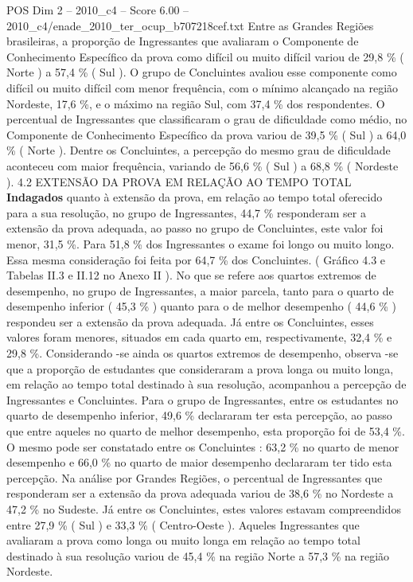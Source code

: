\begin{textsample}{POS Dim 2 – 2010\_c4 – Score 6.00 – 2010\_c4/enade\_2010\_ter\_ocup\_b707218cef.txt}
Entre as Grandes Regiões brasileiras, a proporção de Ingressantes que avaliaram o Componente de Conhecimento Específico da prova como difícil ou muito difícil variou de 29,8 \% ( Norte ) a 57,4 \% ( Sul ).
O grupo de Concluintes avaliou esse componente como difícil ou muito difícil com menor frequência, com o mínimo alcançado na região Nordeste, 17,6 \%, e o máximo na região Sul, com 37,4 \% dos respondentes.
O percentual de Ingressantes que classificaram o grau de dificuldade como médio, no Componente de Conhecimento Específico da prova variou de 39,5 \% ( Sul ) a 64,0 \% ( Norte ).
Dentre os Concluintes, a percepção do mesmo grau de dificuldade aconteceu com maior frequência, variando de 56,6 \% ( Sul ) a 68,8 \% ( Nordeste ). 4.2 EXTENSÃO DA PROVA EM RELAÇÃO AO TEMPO TOTAL \textbf{Indagados} quanto à extensão da prova, em relação ao tempo total oferecido para a sua resolução, no grupo de Ingressantes, 44,7 \% responderam ser a extensão da prova adequada, ao passo no grupo de Concluintes, este valor foi menor, 31,5 \%.
Para 51,8 \% dos Ingressantes o exame foi longo ou muito longo.
Essa mesma consideração foi feita por 64,7 \% dos Concluintes. ( Gráfico 4.3 e Tabelas II.3 e II.12 no Anexo II ).
No que se refere aos quartos extremos de desempenho, no grupo de Ingressantes, a maior parcela, tanto para o quarto de desempenho inferior ( 45,3 \% ) quanto para o de melhor desempenho ( 44,6 \% ) respondeu ser a extensão da prova adequada.
Já entre os Concluintes, esses valores foram menores, situados em cada quarto em, respectivamente, 32,4 \% e 29,8 \%.
Considerando -se ainda os quartos extremos de desempenho, observa -se que a proporção de estudantes que consideraram a prova longa ou muito longa, em relação ao tempo total destinado à sua resolução, acompanhou a percepção de Ingressantes e Concluintes.
Para o grupo de Ingressantes, entre os estudantes no quarto de desempenho inferior, 49,6 \% declararam ter esta percepção, ao passo que entre aqueles no quarto de melhor desempenho, esta proporção foi de 53,4 \%.
O mesmo pode ser constatado entre os Concluintes : 63,2 \% no quarto de menor desempenho e 66,0 \% no quarto de maior desempenho declararam ter tido esta percepção.
Na análise por Grandes Regiões, o percentual de Ingressantes que responderam ser a extensão da prova adequada variou de 38,6 \% no Nordeste a 47,2 \% no Sudeste.
Já entre os Concluintes, estes valores estavam compreendidos entre 27,9 \% ( Sul ) e 33,3 \% ( Centro-Oeste ).
Aqueles Ingressantes que avaliaram a prova como longa ou muito longa em relação ao tempo total destinado à sua resolução variou de 45,4 \% na região Norte a 57,3 \% na região Nordeste.

\end{textsample}
